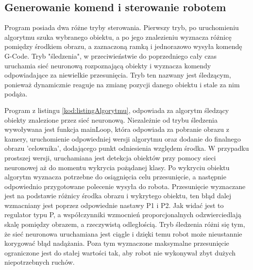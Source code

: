 \subsection{Generowanie komend i sterowanie robotem}
Program posiada dwa różne tryby sterowania. Pierwszy tryb, po uruchomieniu algorytmu szuka wybranego obiektu, a po 
jego znalezieniu wyznacza różnicę pomiędzy środkiem obrazu, a zaznaczoną ramką i jednorazowo wysyła komendę G-Code.
Tryb "śledzenia", w przeciwieństwie do poprzedniego cały czas uruchamia sieć neuronową rozpoznającą obiekty i
wyznacza komendy odpowiadające za niewielkie przesunięcia. 
Tryb ten nazwany jest śledzącym, ponieważ dynamicznie reaguje na zmianę pozycji danego obiektu i stale za nim podąża.

Program z listingu \ref{kod:listingAlgorytmu}, odpowiada za algorytm śledzący obiekty znalezione przez sieć neuronową. 
Niezależnie od trybu śledzenia wywoływana jest funkcja mainLoop, która odpowiada za pobranie
obrazu z kamery, uruchomienie odpowiedniej wersji algorytmu oraz dodanie do finalnego obrazu 'celownika', 
dodającego punkt odniesienia względem środka. W przypadku prostszej wersji, uruchamiana jest detekcja obiektów przy pomocy 
sieci neuronowej aż do momentu wykrycia pożądanej klasy. Po wykryciu obiektu algorytm wyznacza potrzebne do osiągnięcia celu przesunięcie, 
a następnie odpowiednio przygotowane polecenie wysyła do robota. Przesunięcie wyznaczane jest na podstawie różnicy 
środka obrazu i wykrytego obiektu, ten błąd dalej wzmacniany jest poprzez odpowiednie nastawy P1 i P2. 
Jak widać jest to regulator typu P, a współczynniki wzmocnień proporcjonalnych odzwierciedlają skalę pomiędzy obrazem, a rzeczywistą odległością.
Tryb śledzenia różni się tym, że sieć neuronowa uruchamiana jest ciągle i dzięki temu robot może nieustannie korygować błąd nadążania. 
Poza tym wyznaczone maksymalne przesunięcie ograniczone jest do stałej wartości tak, aby robot nie wykonywał zbyt dużych niepotrzebnych ruchów. 